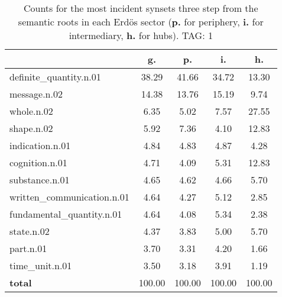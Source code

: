 \begin{table}[h!]
\begin{center}
\begin{tabular}{| l | c | c | c | c |}\hline
 & g. & p. & i. & h. \\\hline
definite\_quantity.n.01 & 38.29  & 41.66  & 34.72  & 13.30 \\\hline
message.n.02 & 14.38  & 13.76  & 15.19  & 9.74 \\\hline
whole.n.02 & 6.35  & 5.02  & 7.57  & 27.55 \\\hline
shape.n.02 & 5.92  & 7.36  & 4.10  & 12.83 \\\hline
indication.n.01 & 4.84  & 4.83  & 4.87  & 4.28 \\\hline
cognition.n.01 & 4.71  & 4.09  & 5.31  & 12.83 \\\hline
substance.n.01 & 4.65  & 4.62  & 4.66  & 5.70 \\\hline
written\_communication.n.01 & 4.64  & 4.27  & 5.12  & 2.85 \\\hline
fundamental\_quantity.n.01 & 4.64  & 4.08  & 5.34  & 2.38 \\\hline
state.n.02 & 4.37  & 3.83  & 5.00  & 5.70 \\\hline
part.n.01 & 3.70  & 3.31  & 4.20  & 1.66 \\\hline
time\_unit.n.01 & 3.50  & 3.18  & 3.91  & 1.19 \\\hline
{{\bf total}} & 100.00  & 100.00  & 100.00  & 100.00 \\\hline
\end{tabular}
\caption{Counts for the most incident synsets three step from the semantic roots in each Erd\"os sector ({\bf p.} for periphery, {\bf i.} for intermediary, {\bf h.} for hubs). TAG: 1}
\end{center}
\end{table}